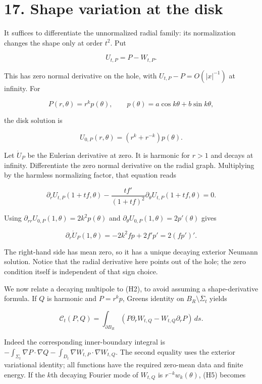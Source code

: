 \documentclass[11pt]{article}
\begin{document}
\section{17. Shape variation at the
disk}\label{shape-variation-at-the-disk}

It suffices to differentiate the unnormalized radial family: its
normalization changes the shape only at order \(t^2\). Put

\[
 U_{t,P}=P-W_{t,P}.
\]

This has zero normal derivative on the hole, with
\(U_{t,P}-P=O(|x|^{-1})\) at infinity. For

\[
 P(r,\theta)=r^k p(\theta),\qquad
 p(\theta)=a\cos k\theta+b\sin k\theta,
\]

the disk solution is

\[
 U_{0,P}(r,\theta)=(r^k+r^{-k})p(\theta).
 \tag{H3}
\]

Let \(\dot U_P\) be the Eulerian derivative at zero. It is harmonic for
\(r>1\) and decays at infinity. Differentiate the zero normal derivative
on the radial graph. Multiplying by the harmless normalizing factor,
that equation reads

\[
 \partial_r U_{t,P}(1+tf,\theta)
   -\frac{t f'}{(1+tf)^2}\partial_\theta U_{t,P}(1+tf,\theta)=0.
\]

Using \(\partial_{rr}U_{0,P}(1,\theta)=2k^2p(\theta)\) and
\(\partial_\theta U_{0,P}(1,\theta)=2p'(\theta)\) gives

\[
 \partial_r\dot U_P(1,\theta)
       =-2k^2 f p+2f'p'=2(fp')'.
 \tag{H4}
\]

The right-hand side has mean zero, so it has a unique decaying exterior
Neumann solution. Notice that the radial derivative here points out of
the hole; the zero condition itself is independent of that sign choice.

We now relate a decaying multipole to (H2), to avoid assuming a
shape-derivative formula. If \(Q\) is harmonic and \(P=r^k p\),
Green\textquotesingle s identity on \(B_R\setminus\overline\Sigma_t\)
yields

\[
 \mathcal C_t(P,Q)
 =\int_{\partial B_R}
        (P\partial_r W_{t,Q}-W_{t,Q}\partial_rP)\,ds.
 \tag{H5}
\]

Indeed the corresponding inner-boundary integral is
\(-\int_{\Sigma_t}\nabla P\cdot\nabla Q
 -\int_{D_t}\nabla W_{t,P}\cdot\nabla W_{t,Q}\). The second equality
uses the exterior variational identity; all functions have the required
zero-mean data and finite energy. If the \(k\)th decaying Fourier mode
of \(W_{t,Q}\) is \(r^{-k}w_k(\theta)\), (H5) becomes
\end{document}
